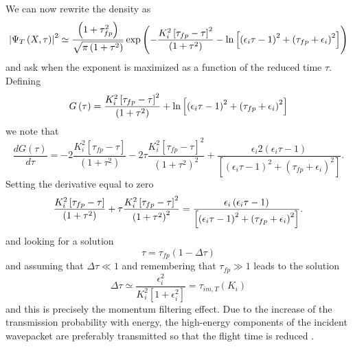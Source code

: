 \documentclass[preprint,aps]{revtex4}
\begin{document}
We can now rewrite the density as
\begin{equation}
	\left\vert \Psi _{T}\left( X,\tau \right) \right\vert ^{2}\simeq \frac{%
		\left( 1+\tau _{fp}^{2}\right) }{\sqrt{\pi \left( 1+\tau ^{2}\right) }}\exp
	\left( -\frac{K_{i}^{2}\left[ \tau _{fp}-\tau \right] ^{2}}{\left( 1+\tau
		^{2}\right) }-\ln \left[ \left( \epsilon _{i}\tau -1\right) ^{2}+\left( \tau
	_{fp}+\epsilon _{i}\right) ^{2}\right] \right)
\end{equation}%
and ask when the exponent is maximized as a function of the reduced time $%
\tau $. Defining
\begin{equation}
	G\left( \tau \right) =\frac{K_{i}^{2}\left[ \tau _{fp}-\tau \right] ^{2}}{%
		\left( 1+\tau ^{2}\right) }+\ln \left[ \left( \epsilon _{i}\tau -1\right)
	^{2}+\left( \tau _{fp}+\epsilon _{i}\right) ^{2}\right]
\end{equation}%
we note that%
\begin{equation}
	\frac{dG\left( \tau \right) }{d\tau }=-2\frac{K_{i}^{2}\left[ \tau
		_{fp}-\tau \right] }{\left( 1+\tau ^{2}\right) }-2\tau \frac{K_{i}^{2}\left[
		\tau _{fp}-\tau \right] ^{2}}{\left( 1+\tau ^{2}\right) ^{2}}+\frac{\epsilon
		_{i}2\left( \epsilon _{i}\tau -1\right) }{\left[ \left( \epsilon _{i}\tau
		-1\right) ^{2}+\left( \tau _{fp}+\epsilon _{i}\right) ^{2}\right] }.
\end{equation}%
Setting the derivative equal to zero
\begin{equation}
	\frac{K_{i}^{2}\left[ \tau _{fp}-\tau \right] }{\left( 1+\tau ^{2}\right) }%
	+\tau \frac{K_{i}^{2}\left[ \tau _{fp}-\tau \right] ^{2}}{\left( 1+\tau
		^{2}\right) ^{2}}=\frac{\epsilon _{i}\left( \epsilon _{i}\tau -1\right) }{%
		\left[ \left( \epsilon _{i}\tau -1\right) ^{2}+\left( \tau _{fp}+\epsilon
		_{i}\right) ^{2}\right] }.
\end{equation}%
and looking for a solution
\begin{equation}
	\tau =\tau _{fp}\left( 1-\Delta \tau \right)
\end{equation}%
and assuming that $\Delta \tau \ll 1$ and remembering that $\tau _{fp}\gg 1$
leads to the solution%
\begin{equation}
	\Delta \tau \simeq \frac{\epsilon _{i}^{2}}{K_{i}^{2}\left[ 1+\epsilon
		_{i}^{2}\right] }=\tau _{im,T}\left( K_{i}\right)
\end{equation}%
and this is precisely the momentum filtering effect. Due to the increase of the transmission probability with energy, the high-energy components of the incident wavepacket are preferably transmitted so that the flight time is reduced \cite{Filinov}.
\end{document}
